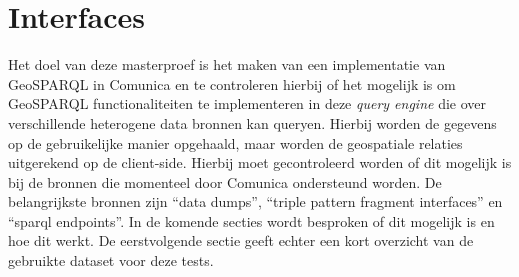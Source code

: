\chapter{Interfaces}
\label{chap:interfaces}
Het doel van deze masterproef is het maken van een implementatie van GeoSPARQL in Comunica en te controleren hierbij of het mogelijk is om GeoSPARQL functionaliteiten te implementeren in deze \textit{query engine} die over verschillende heterogene data bronnen kan queryen. Hierbij worden de gegevens op de gebruikelijke manier opgehaald, maar worden de geospatiale relaties uitgerekend op de client-side. Hierbij moet gecontroleerd worden  of dit mogelijk is bij de bronnen die momenteel door Comunica ondersteund worden. De belangrijkste bronnen zijn ``data dumps'', ``triple pattern fragment interfaces'' en ``sparql endpoints''. In de komende secties wordt besproken of dit mogelijk is en hoe dit werkt. De eerstvolgende sectie geeft echter een kort overzicht van de gebruikte dataset voor deze tests.


 
\newpage
 
\newpage
 
\newpage
 
\newpage